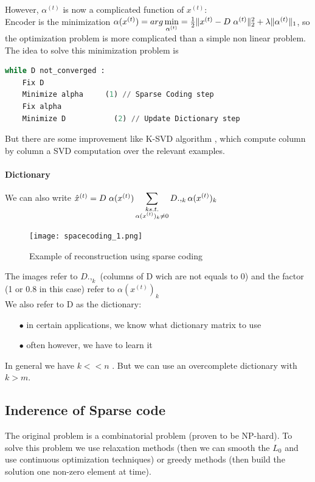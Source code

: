 \documentclass[a4paper,10pt]{article}
\begin{document}
However, $\alpha^{(t)}$ is now a complicated function of $x^{(t)}$:\\
Encoder is the minimization $\alpha(x^{(t)}) = arg\min\limits_{\alpha^{(t)}}= \frac{1}{2} \| x^{(t)} - D \hspace{3px} \alpha^{(t)} \|_2^2 + \lambda \|\alpha^{(t)} \|_1$, so the optimization problem is more complicated than a simple non linear problem.\\
The idea to solve this minimization problem is \cite{NIPS2006_2979}

\begin{lstlisting}[language=Python,frame=single]
while D not_converged :
    Fix D
    Minimize alpha     (1) // Sparse Coding step
    Fix alpha
    Minimize D           (2) // Update Dictionary step
\end{lstlisting}

But there are some improvement like K-SVD algorithm \cite{KSVD}, which compute column by column a SVD computation over the relevant examples.
\paragraph{Dictionary}
We can also write $\hat{x}^{(t)} = D\hspace{3px} \alpha(x^{(t)}) \displaystyle\sum_{\substack{k s.t.\\ \alpha(x^{(t)})_k\neq 0}}  D.,_k \alpha(x^{(t)} )_k$
\begin{figure}[h]
 \centering
 \texttt{[image: spacecoding\_1.png]}
  \caption{Example of reconstruction using sparse coding}
\end{figure}

The images refer to $D.,_k$ (columns of D wich are not equals to 0) and the factor (1 or 0.8 in this case) refer to $\alpha(x^{(t)} )_k$
\\We also refer to D as the dictionary:
\begin{itemize}
 \item[$\bullet$]in certain applications, we know what dictionary matrix to use
 \item[$\bullet$]often however, we have to learn it
\end{itemize}

In general we have $k<<n$ . But we can use an overcomplete dictionary with $k > m$.
\subsection{Inderence of Sparse code}
The original problem is a combinatorial problem (proven to be NP-hard). To solve this problem we use relaxation methods (then we can smooth the $L_0$ and use continuous optimization techniques) or greedy methods (then build the solution one non-zero element at time).
\end{document}
